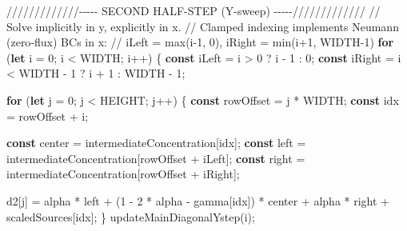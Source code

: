 \documentclass[
  letterpaper,
  DIV=11,
  numbers=noendperiod]{scrreprt}
\newenvironment{Shaded}{\begin{snugshade}}{\end{snugshade}}
\newcommand{\CommentTok}[1]{\textcolor[rgb]{0.37,0.37,0.37}{#1}}
\newcommand{\ControlFlowTok}[1]{\textcolor[rgb]{0.00,0.23,0.31}{\textbf{#1}}}
\newcommand{\DecValTok}[1]{\textcolor[rgb]{0.68,0.00,0.00}{#1}}
\newcommand{\FunctionTok}[1]{\textcolor[rgb]{0.28,0.35,0.67}{#1}}
\newcommand{\KeywordTok}[1]{\textcolor[rgb]{0.00,0.23,0.31}{\textbf{#1}}}
\newcommand{\NormalTok}[1]{\textcolor[rgb]{0.00,0.23,0.31}{#1}}
\newcommand{\OperatorTok}[1]{\textcolor[rgb]{0.37,0.37,0.37}{#1}}
\begin{document}
\begin{Shaded}
\begin{Highlighting}[]
        \CommentTok{/////////////{-}{-}{-}{-}{-}  SECOND HALF{-}STEP (Y{-}sweep)  {-}{-}{-}{-}{-}/////////////}
        \CommentTok{// Solve implicitly in y, explicitly in x.}
        \CommentTok{// Clamped indexing implements Neumann (zero{-}flux) BCs in x:}
        \CommentTok{//   iLeft = max(i{-}1, 0),  iRight = min(i+1, WIDTH{-}1)}
        \ControlFlowTok{for}\NormalTok{ (}\KeywordTok{let}\NormalTok{ i }\OperatorTok{=} \DecValTok{0}\OperatorTok{;}\NormalTok{ i }\OperatorTok{\textless{}}\NormalTok{ WIDTH}\OperatorTok{;}\NormalTok{ i}\OperatorTok{++}\NormalTok{) \{}
            \KeywordTok{const}\NormalTok{ iLeft }\OperatorTok{=}\NormalTok{ i }\OperatorTok{\textgreater{}} \DecValTok{0} \OperatorTok{?}\NormalTok{ i }\OperatorTok{{-}} \DecValTok{1} \OperatorTok{:} \DecValTok{0}\OperatorTok{;}
            \KeywordTok{const}\NormalTok{ iRight }\OperatorTok{=}\NormalTok{ i }\OperatorTok{\textless{}}\NormalTok{ WIDTH }\OperatorTok{{-}} \DecValTok{1} \OperatorTok{?}\NormalTok{ i }\OperatorTok{+} \DecValTok{1} \OperatorTok{:}\NormalTok{ WIDTH }\OperatorTok{{-}} \DecValTok{1}\OperatorTok{;}

            \ControlFlowTok{for}\NormalTok{ (}\KeywordTok{let}\NormalTok{ j }\OperatorTok{=} \DecValTok{0}\OperatorTok{;}\NormalTok{ j }\OperatorTok{\textless{}}\NormalTok{ HEIGHT}\OperatorTok{;}\NormalTok{ j}\OperatorTok{++}\NormalTok{) \{}
                \KeywordTok{const}\NormalTok{ rowOffset }\OperatorTok{=}\NormalTok{ j }\OperatorTok{*}\NormalTok{ WIDTH}\OperatorTok{;}
                \KeywordTok{const}\NormalTok{ idx }\OperatorTok{=}\NormalTok{ rowOffset }\OperatorTok{+}\NormalTok{ i}\OperatorTok{;}

                \KeywordTok{const}\NormalTok{ center }\OperatorTok{=}\NormalTok{ intermediateConcentration[idx]}\OperatorTok{;}
                \KeywordTok{const}\NormalTok{ left }\OperatorTok{=}\NormalTok{ intermediateConcentration[rowOffset }\OperatorTok{+}\NormalTok{ iLeft]}\OperatorTok{;}
                \KeywordTok{const}\NormalTok{ right }\OperatorTok{=}\NormalTok{ intermediateConcentration[rowOffset }\OperatorTok{+}\NormalTok{ iRight]}\OperatorTok{;}

\NormalTok{                d2[j] }\OperatorTok{=}
\NormalTok{                    alpha }\OperatorTok{*}\NormalTok{ left }\OperatorTok{+}
\NormalTok{                    (}\DecValTok{1} \OperatorTok{{-}} \DecValTok{2} \OperatorTok{*}\NormalTok{ alpha }\OperatorTok{{-}}\NormalTok{ gamma[idx]) }\OperatorTok{*}\NormalTok{ center }\OperatorTok{+}
\NormalTok{                    alpha }\OperatorTok{*}\NormalTok{ right }\OperatorTok{+}
\NormalTok{                    scaledSources[idx]}\OperatorTok{;}
\NormalTok{            \}}
            \FunctionTok{updateMainDiagonalYstep}\NormalTok{(i)}\OperatorTok{;}


\end{Highlighting}
\end{Shaded}
\end{document}
